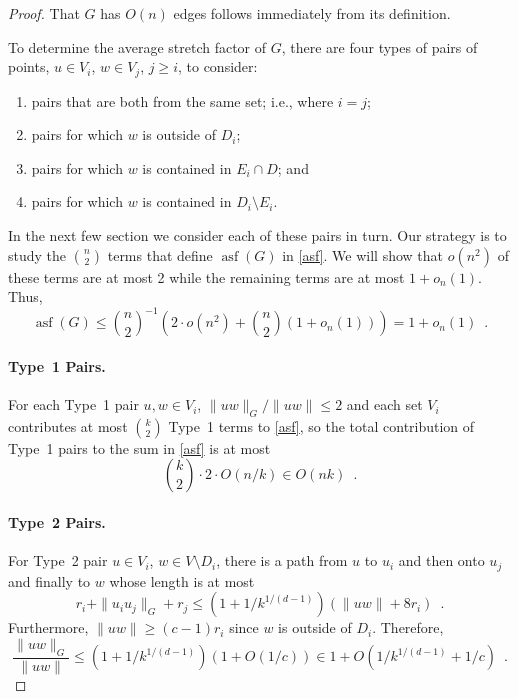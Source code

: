 \documentclass{patmorin}
\DeclareMathOperator{\asf}{asf}
\begin{document}
\begin{proof}
  That $G$ has $O(n)$ edges follows immediately from its definition.

  To determine the average stretch factor of $G$, there are four types
  of pairs of points, $u\in V_i$, $w\in V_j$, $j\ge i$, to consider:
  \begin{enumerate}
    \item pairs that are both from the same set; i.e., where $i=j$;
    \item pairs for which $w$ is outside of $D_i$;
    \item pairs for which $w$ is contained in $E_i\cap D$; and
    \item pairs for which $w$ is contained in $D_i\setminus E_i$.
  \end{enumerate}
  In the next few section we consider each of these pairs in turn.
  Our strategy is to study the $\binom{n}{2}$ terms that define $\asf(G)$
  in \eqref{asf}.  We will show that $o(n^2)$ of these terms are at most
  2 while the remaining terms are at most $1+o_n(1)$.  Thus,
  \[
     \asf(G)\le \binom{n}{2}^{-1}\left(2\cdot o(n^2)
                                       +\binom{n}{2}(1+o_n(1))\right)
     = 1+o_n(1) \enspace .
  \]

  \paragraph{Type~1 Pairs.}
  For each Type~1 pair $u,w\in V_i$, $\|uw\|_G/\|uw\|\le 2$ and each set
  $V_i$ contributes at most $\binom{k}{2}$ Type~1 terms to \eqref{asf},
  so the total contribution of Type~1 pairs to the sum in \eqref{asf} is at most
  \[
    \binom{k}{2}\cdot 2 \cdot O(n/k) \in O(nk)
      \enspace .
  \]

  \paragraph{Type~2 Pairs.}
  For Type~2 pair $u\in V_i$, $w\in V\setminus D_i$, there is a path
  from $u$ to $u_i$ and then onto $u_j$ and finally to $w$ whose length
  is at most
  \[
     r_i + \|u_iu_j\|_G + r_j
      \le (1+1/k^{1/(d-1)})(\|uw\| + 8r_i) \enspace .
  \]
  Furthermore, $\|uw\|\ge (c-1)r_i$ since $w$ is outside of $D_i$.
  Therefore,
  \[
    \frac{\|uw\|_G}{\|uw\|}\le (1+1/k^{1/(d-1)})(1+O(1/c)) 
       \in 1+O(1/k^{1/(d-1)}+1/c) \enspace .
  \]


\end{proof}
\end{document}
